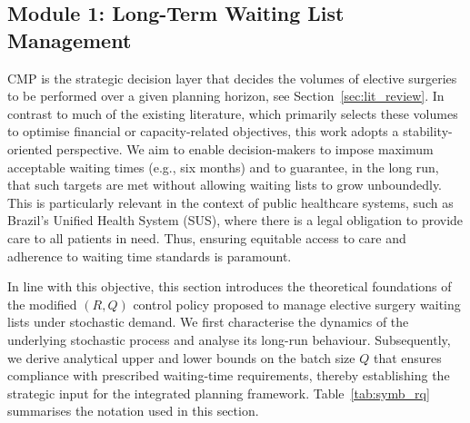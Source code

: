 \subsection{Module 1: Long-Term Waiting List Management\label{sec:waitinglist}}

CMP is the strategic decision layer that decides the volumes of elective surgeries to be performed over a given planning horizon, see Section~\ref{sec:lit_review}. 
In contrast to much of the existing literature, which primarily selects these volumes to optimise financial or capacity-related objectives, this work adopts a stability-oriented perspective.
We aim to enable decision-makers to impose maximum acceptable waiting times (e.g., six months) and to guarantee, in the long run, that such targets are met without allowing waiting lists to grow unboundedly. 
This is particularly relevant in the context of public healthcare systems, such as Brazil's Unified Health System (SUS), where there is a legal obligation to provide care to all patients in need.
Thus, ensuring equitable access to care and adherence to waiting time standards is paramount.

In line with this objective, this section introduces the theoretical foundations of the modified $(R,Q)$ control policy proposed to manage elective surgery waiting lists under stochastic demand.
We first characterise the dynamics of the underlying stochastic process and analyse its long-run behaviour. 
Subsequently, we derive analytical upper and lower bounds on the batch size $Q$ that ensures compliance with prescribed waiting-time requirements, thereby establishing the strategic input for the integrated planning framework.
Table~\ref{tab:symb_rq} summarises the notation used in this section.

